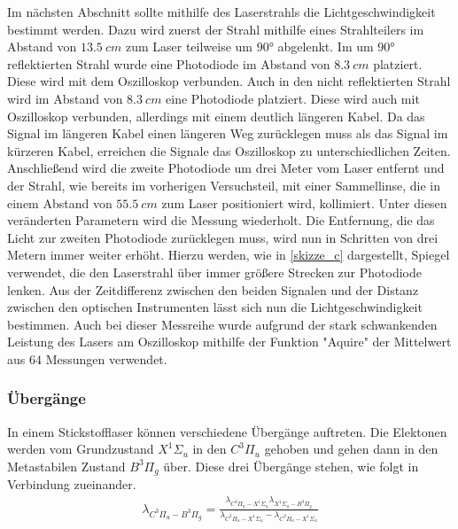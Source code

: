 \documentclass[
	a4paper,
	12pt,
	pagesize,
	ngerman
]{scrartcl}
\begin{document}
Im nächsten Abschnitt sollte mithilfe des Laserstrahls die Lichtgeschwindigkeit bestimmt werden. Dazu wird zuerst der Strahl mithilfe eines Strahlteilers im Abstand von $\SI{13,5}{cm}$ zum Laser teilweise um $90$° abgelenkt. Im um $90$° reflektierten Strahl wurde eine Photodiode im Abstand von $\SI{8,3}{cm}$ platziert. Diese wird mit dem Oszilloskop verbunden. Auch in den nicht reflektierten Strahl wird im Abstand von $\SI{8,3}{cm}$ eine Photodiode platziert. Diese wird auch mit Oszilloskop verbunden, allerdings mit einem deutlich längeren Kabel. Da das Signal im längeren Kabel einen längeren Weg zurücklegen muss als das Signal im kürzeren Kabel, erreichen die Signale das Oszilloskop zu unterschiedlichen Zeiten.
Anschließend wird die zweite Photodiode um drei Meter vom Laser entfernt und der Strahl, wie bereits im vorherigen Versuchsteil, mit einer Sammellinse, die in einem Abstand von $\SI{55,5}{cm}$ zum Laser positioniert wird, kollimiert. Unter diesen veränderten Parametern wird die Messung wiederholt. Die Entfernung, die das Licht zur zweiten Photodiode zurücklegen muss, wird nun in Schritten von drei Metern immer weiter erhöht. Hierzu werden, wie in \cref{skizze_c} dargestellt, Spiegel verwendet, die den Laserstrahl über immer größere Strecken zur Photodiode lenken.
Aus der Zeitdifferenz zwischen den beiden Signalen und der Distanz zwischen den optischen Instrumenten lässt sich nun die Lichtgeschwindigkeit bestimmen.
Auch bei dieser Messreihe wurde aufgrund der stark schwankenden Leistung des Lasers am Oszilloskop mithilfe der Funktion "Aquire" der Mittelwert aus $64$ Messungen verwendet.

\subsubsection{Übergänge}
In einem Stickstofflaser können verschiedene Übergänge auftreten. Die Elektonen werden vom Grundzustand $X^1\Sigma_u$ in den $C^3\Pi_u$ gehoben und gehen dann in den Metastabilen Zustand $B^3\Pi_g$ über. Diese drei Übergänge stehen, wie folgt in Verbindung zueinander.
\begin{align}
\lambda_{C^3\Pi_u-B^3\Pi_g} =  \frac{\lambda_{C^3\Pi_u-X^1\Sigma_u}\lambda_{X^1\Sigma_u-B^3\Pi_g}}{\lambda_{C^3\Pi_u-X^1\Sigma_u}-\lambda_{C^3\Pi_u-X^1\Sigma_u}} 
\end{align}
\end{document}
